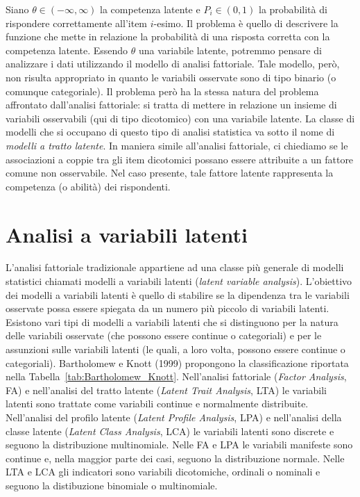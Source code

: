 Siano $\theta \in (-\infty, \infty)$ la competenza latente e $P_i \in (0, 1)$ la probabilità di rispondere correttamente all'item $i$-esimo. 
Il problema è quello di descrivere la funzione che mette in relazione la probabilità di una risposta corretta con  la competenza latente. 
Essendo $\theta$ una variabile latente, potremmo pensare di analizzare i dati  utilizzando il modello di analisi fattoriale.  
Tale modello, però, non risulta appropriato in quanto le variabili osservate sono di tipo binario (o comunque categoriale). 
Il problema però ha la stessa natura del problema affrontato dall'analisi fattoriale: si tratta di mettere in relazione un insieme di variabili osservabili (qui di tipo dicotomico) con una variabile latente. 
La classe di modelli che si occupano di questo tipo di analisi statistica va sotto il nome di \emph{modelli a tratto latente}. 
In maniera simile all'analisi fattoriale, ci chiediamo se le associazioni a coppie tra gli item dicotomici possano essere attribuite a un fattore comune non osservabile.  
Nel caso presente, tale fattore latente rappresenta la competenza (o  abilità) dei rispondenti. 

\section{Analisi a variabili latenti}

L'analisi fattoriale tradizionale appartiene ad una classe più generale di modelli statistici chiamati modelli a variabili latenti (\textit{latent variable analysis}).  
L'obiettivo dei modelli a variabili latenti è quello di stabilire se la dipendenza tra le variabili osservate possa essere spiegata da un numero più piccolo di variabili latenti. 
Esistono vari tipi di modelli a variabili latenti che si distinguono per la natura delle variabili osservate (che possono essere continue o categoriali) e per le assunzioni sulle variabili latenti (le quali, a loro volta, possono essere continue o categoriali).  
Bartholomew e Knott (1999) propongono la classificazione riportata nella Tabella~\ref{tab:Bartholomew_Knott}. 
Nell'analisi fattoriale (\textit{Factor Analysis}, FA)  e nell'analisi del tratto latente (\textit{Latent Trait Analysis}, LTA) le variabili latenti sono trattate come variabili continue e normalmente distribuite.
Nell'analisi del profilo latente (\textit{Latent Profile Analysis}, LPA) e nell'analisi della classe latente (\textit{Latent Class Analysis}, LCA) le variabili latenti sono discrete e seguono la distribuzione multinomiale. 
Nelle FA e LPA le variabili manifeste sono continue e, nella maggior parte dei casi, seguono la distribuzione normale. 
Nelle LTA e LCA gli indicatori sono variabili dicotomiche, ordinali o nominali e seguono la distibuzione binomiale o multinomiale.

